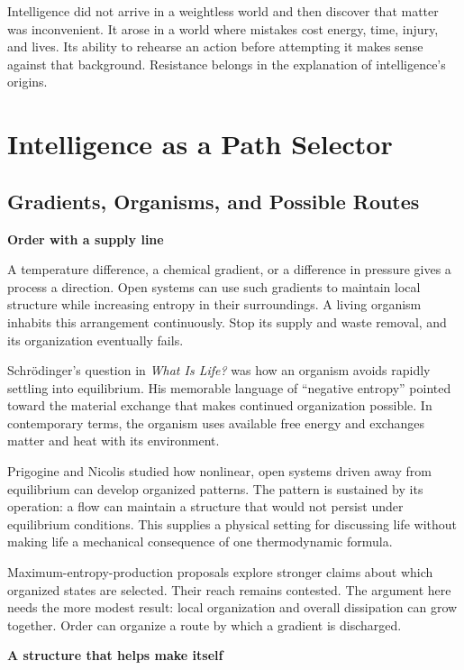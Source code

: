 \documentclass[11pt,openany]{book}
\newcommand{\subhead}[1]{\par\medskip\noindent\textbf{#1}\par\nobreak\smallskip}
\begin{document}
Intelligence did not arrive in a weightless world and then discover that matter was inconvenient. It arose in a world where mistakes cost energy, time, injury, and lives. Its ability to rehearse an action before attempting it makes sense against that background. Resistance belongs in the explanation of intelligence's origins.

\section{Intelligence as a Path Selector}

\subsection{Gradients, Organisms, and Possible Routes}

\subhead{Order with a supply line}

A temperature difference, a chemical gradient, or a difference in pressure gives a process a direction. Open systems can use such gradients to maintain local structure while increasing entropy in their surroundings. A living organism inhabits this arrangement continuously. Stop its supply and waste removal, and its organization eventually fails.

Schrödinger's question in \emph{What Is Life?} was how an organism avoids rapidly settling into equilibrium. His memorable language of “negative entropy” pointed toward the material exchange that makes continued organization possible.\cite{schrodinger1944} In contemporary terms, the organism uses available free energy and exchanges matter and heat with its environment.

Prigogine and Nicolis studied how nonlinear, open systems driven away from equilibrium can develop organized patterns.\cite{prigogine1977nobel,nicolis1977} The pattern is sustained by its operation: a flow can maintain a structure that would not persist under equilibrium conditions. This supplies a physical setting for discussing life without making life a mechanical consequence of one thermodynamic formula.

Maximum-entropy-production proposals explore stronger claims about which organized states are selected. Their reach remains contested.\cite{martyushev2006,bruers2007} The argument here needs the more modest result: local organization and overall dissipation can grow together. Order can organize a route by which a gradient is discharged.

\subhead{A structure that helps make itself}
\end{document}
